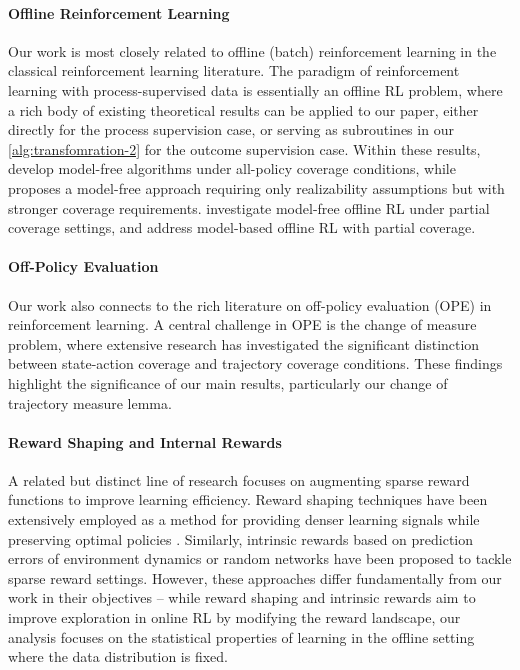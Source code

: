 \paragraph{Offline Reinforcement Learning}
Our work is most closely related to offline (batch) reinforcement learning in the classical reinforcement learning literature.
The paradigm of reinforcement learning with process-supervised data is essentially an offline RL problem, where a rich body of existing theoretical results \citep[e.g.,][]{munos2003error,antos2008learning,farahmand2010error,chen2019information,xie2020q,jin2021pessimism,xie2021batch,xie2021bellman,uehara2021pessimistic,cheng2022adversarially,xie2022armor,bhardwaj2023adversarial} can be applied to our paper, either directly for the process supervision case, or serving as subroutines in our \cref{alg:transfomration-2} for the outcome supervision case.
Within these results, \citet{chen2019information,xie2020q} develop model-free algorithms under all-policy coverage conditions, while \citet{xie2021batch} proposes a model-free approach requiring only realizability assumptions but with stronger coverage requirements. \citet{xie2021bellman,cheng2022adversarially} investigate model-free offline RL under partial coverage settings, and \citet{uehara2021pessimistic,xie2022armor,bhardwaj2023adversarial} address model-based offline RL with partial coverage.

\paragraph{Off-Policy Evaluation}
Our work also connects to the rich literature on off-policy evaluation (OPE) in reinforcement learning. A central challenge in OPE is the change of measure problem, where extensive research \citep{liu2018breaking,xie2019towards,nachum2019dualdice,uehara2020minimax} has investigated the significant distinction between state-action coverage and trajectory coverage conditions. These findings highlight the significance of our main results, particularly our change of trajectory measure lemma.


\paragraph{Reward Shaping and Internal Rewards}
A related but distinct line of research focuses on augmenting sparse reward functions to improve learning efficiency. Reward shaping techniques have been extensively employed as a method for providing denser learning signals while preserving optimal policies \citep[e.g.,][]{ng1999policy,trott2019keeping,gupta2022unpacking}. Similarly, intrinsic rewards based on prediction errors of environment dynamics \citep{pathak2017curiosity} or random networks \citep{burda2018exploration} have been proposed to tackle sparse reward settings. However, these approaches differ fundamentally from our work in their objectives -- while reward shaping and intrinsic rewards aim to improve exploration in online RL by modifying the reward landscape, our analysis focuses on the statistical properties of learning in the offline setting where the data distribution is fixed.
